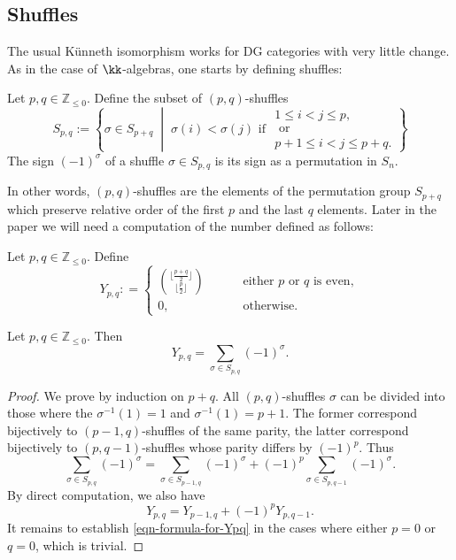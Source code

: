\documentclass[12pt,a4paper,reqno]{amsart}
\begin{document}
\subsection{Shuffles}
\label{section-shuffles}
The usual K{\"u}nneth isomorphism works for DG categories with very little change. 
As in the case of $\kk$-algebras, one starts by defining shuffles: 
\begin{defn}
	Let $p,q \in \mathbb{Z}_{\leq 0}$. Define the subset of $(p,q)$-shuffles
	\begin{equation}
		S_{p,q} := \left\{ \sigma \in S_{p+q} \;\middle|\;
		\sigma(i) < \sigma(j) \text{ if } 
		\begin{matrix}
			1 \leq i < j \leq p, \\
			\text{ or }\\
			p+1 \leq i < j \leq p+q. 
		\end{matrix}
		\right\}
	\end{equation}
	The sign $(-1)^{\sigma}$ of a shuffle $\sigma \in S_{p,q}$ is its sign
	as a permutation in $S_n$. 
\end{defn}

In other words, $(p,q)$-shuffles are the elements of the permutation
group $S_{p+q}$ which preserve relative order of the first $p$ and 
the last $q$ elements.  Later in the paper we will need a computation 
of the number defined as follows: 
\begin{defn}
	Let $p,q \in \mathbb{Z}_{\leq 0}$. Define
	$$ Y_{p,q} : = 
	\begin{cases}
		\binom{\lfloor \frac{p+q}{2} \rfloor}{\lfloor \frac{p}{2} \rfloor}
		\quad \quad & \text{ either } p \text{ or } q \text{ is even},
		\\
		0, & \text{ otherwise. }
	\end{cases}
	$$
\end{defn}

\begin{lemma}
	Let $p,q \in \mathbb{Z}_{\leq 0}$. Then 
	\begin{equation}
		\label{eqn-formula-for-Ypq}
		Y_{p,q} = \sum_{\sigma \in S_{p,q}} (-1)^{\sigma}.
	\end{equation}
\end{lemma}
\begin{proof}
	We prove by induction on $p+q$.
	All $(p,q)$-shuffles $\sigma$ can be divided into those where the
	$\sigma^{-1}(1) = 1$ and $\sigma^{-1}(1) = p+1$. The former 
	correspond bijectively to $(p-1,q)$-shuffles of the same parity, 
	the latter correspond bijectively to $(p,q-1)$-shuffles whose
	parity differs by $(-1)^{p}$. Thus 
	$$ \sum_{\sigma \in S_{p,q}} (-1)^{\sigma}
	= \sum_{\sigma \in S_{p-1,q}} (-1)^{\sigma} + (-1)^p
	\sum_{\sigma \in S_{p,q-1}} (-1)^{\sigma}. $$
	By direct computation, we also have 
	\begin{equation}
		\label{eqn-recursive-formula-for-Ypq}
		Y_{p,q} = Y_{p-1,q} + (-1)^p Y_{p,q-1}.
	\end{equation}
	It remains to establish \eqref{eqn-formula-for-Ypq}
	in the cases where either $p=0$ or $q=0$, which is trivial. 
\end{proof}
\end{document}
